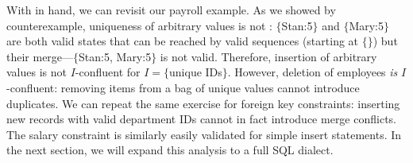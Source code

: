  With \iconfluence in hand, we can
revisit our payroll example. As we showed by counterexample,
uniqueness of arbitrary values is not \iconfluent: $\{$Stan:5$\}$ and
$\{$Mary:5$\}$ are both valid states that can be reached by valid
sequences (starting at $\{\}$) but their merge---$\{$Stan:5,
Mary:5$\}$ is not valid. Therefore, insertion of arbitrary values is
not $I$-confluent for $I=\{$unique IDs$\}$. However, deletion of
employees \textit{is} $I$-confluent: removing items from a bag of
unique values cannot introduce duplicates. We can repeat the same
exercise for foreign key constraints: inserting new records with valid
department IDs cannot in fact introduce merge conflicts. The salary
constraint is similarly easily validated for simple insert
statements. In the next section, we will expand this analysis to a
full SQL dialect.

